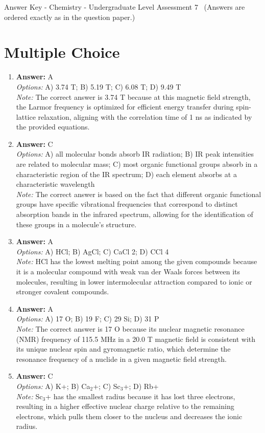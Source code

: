 \documentclass[12pt]{article}
\begin{document}
\begin{center}
Answer Key - Chemistry - Undergraduate Level Assessment 7 \
\small (Answers are ordered exactly as in the question paper.)
\end{center}

\section*{Multiple Choice}
\begin{enumerate}[label=\arabic*.]
\item \textbf{Answer:} A
\\ \textit{Options:} A) 3.74 T; B) 5.19 T; C) 6.08 T; D) 9.49 T
\\ \textit{Note:} The correct answer is 3.74 T because at this magnetic field strength, the Larmor frequency is optimized for efficient energy transfer during spin-lattice relaxation, aligning with the correlation time of 1 ns as indicated by the provided equations.
\item \textbf{Answer:} C
\\ \textit{Options:} A) all molecular bonds absorb IR radiation; B) IR peak intensities are related to molecular mass; C) most organic functional groups absorb in a characteristic region of the IR spectrum; D) each element absorbs at a characteristic wavelength
\\ \textit{Note:} The correct answer is based on the fact that different organic functional groups have specific vibrational frequencies that correspond to distinct absorption bands in the infrared spectrum, allowing for the identification of these groups in a molecule's structure.
\item \textbf{Answer:} A
\\ \textit{Options:} A) HCl; B) AgCl; C) CaCl 2; D) CCl 4
\\ \textit{Note:} HCl has the lowest melting point among the given compounds because it is a molecular compound with weak van der Waals forces between its molecules, resulting in lower intermolecular attraction compared to ionic or stronger covalent compounds.
\item \textbf{Answer:} A
\\ \textit{Options:} A) 17 O; B) 19 F; C) 29 Si; D) 31 P
\\ \textit{Note:} The correct answer is 17 O because its nuclear magnetic resonance (NMR) frequency of 115.5 MHz in a 20.0 T magnetic field is consistent with its unique nuclear spin and gyromagnetic ratio, which determine the resonance frequency of a nuclide in a given magnetic field strength.
\item \textbf{Answer:} C
\\ \textit{Options:} A) K+; B) Ca$_{2}$+; C) Sc$_{3}$+; D) Rb+
\\ \textit{Note:} Sc$_{3}$+ has the smallest radius because it has lost three electrons, resulting in a higher effective nuclear charge relative to the remaining electrons, which pulls them closer to the nucleus and decreases the ionic radius.
\end{enumerate}
\end{document}
